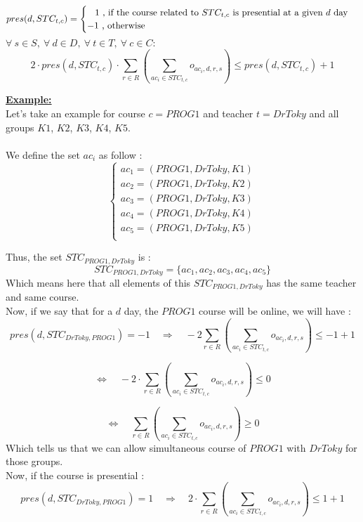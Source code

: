 \documentclass[12pt,a4paper]{article}
\begin{document}
	$$
	pres(d, STC_{t,c}) = 
	\begin{cases}
		\hspace{0.3cm} 1 \text{ , if the course related to  $STC_{t,c}$ is presential at a given $d$ day} \\
		-1 \text{ , otherwise}
	\end{cases} 
	$$
$
\forall \ s \in S,\ \forall \ d \in D, \ \forall \ t \in T, \ \forall \ c \in C :
$
\begin{equation}
2 \cdot pres(d, STC_{t,c}) \cdot \sum_{r\in R}\left(\sum_{ac_{i} \in STC_{t,c}}{o_{ac_{i}, d, r, s}}\right)\leq pres(d, STC_{t,c}) + 1
\end{equation}

\vspace{1cm}\textbf{\underline{Example:}}\vspace{0.3cm} \\ 
Let's take an example for course $c = PROG1$ and teacher $t = Dr Toky$ and all groups $K1$, $K2$, $K3$, $K4$, $K5$. \\ \\
We define the set $ac_i$ as follow :
$$
\begin{cases}
	ac_1 = \left(PROG1, Dr Toky, K1\right) \\
	ac_2 = \left(PROG1, Dr Toky, K2\right) \\
	ac_3 = \left(PROG1, Dr Toky, K3\right) \\
	ac_4 = \left(PROG1, Dr Toky, K4\right) \\
	ac_5 = \left(PROG1, Dr Toky, K5\right) \\
\end{cases}
$$

\vspace{0.5cm}Thus, the set $STC_{PROG1, DrToky}$ is :
\[
STC_{PROG1, DrToky} = \lbrace ac_1, ac_2, ac_3, ac_4, ac_5 \rbrace
\]
Which means here that all elements of this $STC_{PROG1, DrToky}$ has the same teacher and same course.\\
Now, if we say that for a $d$ day, the $PROG1$ course will be online, we will have : \\ 

\[
pres(d, STC_{DrToky,PROG1}) = - 1 \quad \Longrightarrow \quad
-2 \sum_{r\in R}\left(\sum_{ac_{i} \in STC_{t,c}}{o_{ac_{i}, d, r, s}}\right)\leq -1 + 1
\]

\[
\Longleftrightarrow \quad -2 \cdot \sum_{r\in R}\left(\sum_{ac_{i} \in STC_{t,c}}{o_{ac_{i}, d, r, s}}\right)\leq 0
\]

\[
\Longleftrightarrow \quad \sum_{r\in R}\left(\sum_{ac_{i} \in STC_{t,c}}{o_{ac_{i}, d, r, s}}\right)\geq 0
\]
Which tells us that we can allow simultaneous course of $PROG1$ with $DrToky$ for those groups. \vspace{0.5cm} \\
Now, if the course is presential :
\[
pres(d, STC_{DrToky,PROG1}) = 1 \quad \Longrightarrow \quad
2 \cdot \sum_{r\in R}\left(\sum_{ac_{i} \in STC_{t,c}}{o_{ac_{i}, d, r, s}}\right)\leq 1 + 1
\]
\end{document}
